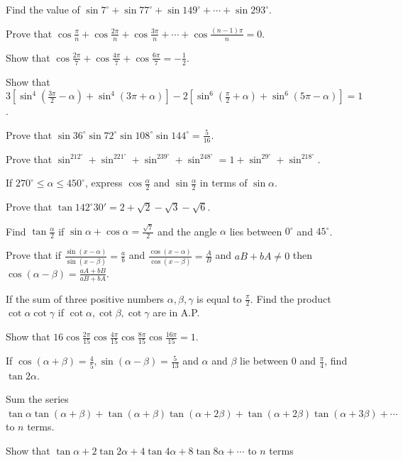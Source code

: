 \item Find the value of $\sin7^\circ + \sin77^\circ + \sin149^\circ + \cdots + \sin293^\circ$.
\item Prove that $\cos\frac{\pi}{n} + \cos\frac{2\pi}{n} + \cos\frac{3\pi}{n} + \cdots + \cos\frac{(n -
  1)\pi}{n} = 0$.
\item Show that $\cos\frac{2\pi}{7} + \cos\frac{4\pi}{7} + \cos\frac{6\pi}{7} = -\frac{1}{2}$.
\item Show that $3\left[\sin^4\left(\frac{3\pi}{2} - \alpha\right) + \sin^4(3\pi + \alpha)\right] -
  2\left[\sin^6\left(\frac{\pi}{2} + \alpha\right) + \sin^6(5\pi - \alpha)\right] = 1$.
\item Prove that $\sin36^\circ\sin72^\circ\sin108^\circ\sin144^\circ = \frac{5}{16}$.
\item Prove that $\sin^212^\circ + \sin^221^\circ + \sin^239^\circ + \sin^248^\circ = 1 + \sin^29^\circ
  + \sin^218^\circ$.
\item If $270^\circ\leq \alpha\leq 450^\circ$, express $\cos\frac{\alpha}{2}$ and $\sin\frac{\alpha}{2}$ in
  terms of $\sin\alpha$.
\item Prove that $\tan142^\circ30' = 2 + \sqrt{2} - \sqrt{3} - \sqrt{6}$.
\item Find $\tan\frac{\alpha}{2}$ if $\sin\alpha + \cos\alpha = \frac{\sqrt{7}}{2}$ and the angle $\alpha$
  lies between $0^\circ$ and $45^\circ$.
\item Prove that if $\frac{\sin(x - \alpha)}{\sin(x - \beta)} = \frac{a}{b}$ and $\frac{\cos(x
  - \alpha)}{\cos(x - \beta)} = \frac{A}{B}$ and $aB + bA\neq 0$ then $\cos(\alpha - \beta) = \frac{aA +
  bB}{aB + bA}$.
\item If the sum of three positive numbers $\alpha, \beta, \gamma$ is equal to $\frac{\pi}{2}$. Find the
  product $\cot\alpha\cot\gamma$ if $\cot\alpha, \cot\beta, \cot\gamma$ are in A.P.
\item Show that $16\cos\frac{2\pi}{15}\cos\frac{4\pi}{15}\cos\frac{8\pi}{15}\cos\frac{16\pi}{15} = 1$.
\item If $\cos(\alpha + \beta) = \frac{4}{5}, \sin(\alpha - \beta) = \frac{5}{13}$ and $\alpha$ and $\beta$
  lie between $0$ and $\frac{\pi}{4}$, find $\tan2\alpha$.
\item Sum the series $\tan\alpha\tan(\alpha + \beta) + \tan(\alpha + \beta)\tan(\alpha + 2\beta)
  + \tan(\alpha + 2\beta)\tan(\alpha + 3\beta) + \cdots$ to $n$ terms.
\item Show that $\tan\alpha + 2\tan2\alpha + 4\tan4\alpha + 8\tan8\alpha + \cdots$ to $n$ terms
